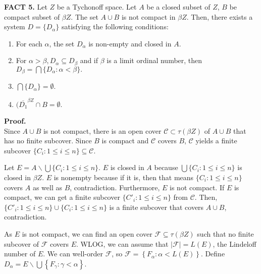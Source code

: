 \documentclass{article}
\begin{document}
\textbf{FACT 5.} Let $Z$ be a Tychonoff space. Let $A$ be a closed subset of $Z$, $B$ be compact subset of $\beta Z$. 
The set $A\cup B$ is not compact in $\beta Z$. 
Then, there exists a system $D=\{D_\alpha\}$ satisfying the following conditions:
\begin{enumerate}
\item For each $  \alpha  $, the set $ D_\alpha  $ is non-empty and closed in $A$.
\item For $ \alpha>\beta, D_\alpha \subseteq D_\beta  $ and if $  \beta $ is a limit ordinal number, then\\$  D_\beta=\bigcap \{D_\alpha:\alpha <\beta\}.$
\item $ \bigcap\{D_\alpha\}=\emptyset . $
\item $(\overline{D_1}^{\beta Z}\cap B =\emptyset.$
	 
\end{enumerate}

\textbf{Proof.} \\
Since $A\cup B $ is not compact, there is an open cover $\mathcal{C} \subset \tau(\beta Z)$ of $A\cup B$ that has no finite subcover.  Since $B$ is compact and $\mathcal{C}$ covers $B$, $\mathcal{C}$ yields a finite subcover $\{C_i:1\leq i \leq n\}\subseteq \mathcal{C}$.
\vskip 10pt

Let $E=A\backslash \bigcup \{C_i:1\leq i \leq n\}$. $E$ is closed in $A$ because $\bigcup \{C_i:1\leq i \leq n\}$ is closed in $\beta Z$. $E$ is nonempty because if it is, then that means $\{C_i:1\leq i \leq n\}$ covers $A$ as well as $B$, contradiction. Furthermore, $E$ is not compact. If $E$ is compact, we can get a finite subcover $\{C'_i:1\leq i\leq n\}$ from $\mathcal{C}$. Then, $\{C'_i:1\leq i\leq n\} \cup \{C_i:1\leq i \leq n\}$ is a finite subcover that covers $A\cup B$, contradiction. 


\vskip 10pt


As $E$ is not compact, we can find an open cover $\mathcal{F}\subseteq \tau(\beta Z)$ such that no finite subcover of $\mathcal{F}$ covers $E$. 
WLOG, we can assume that $|\mathcal{F}|=L(E)$, the Lindeloff number of $E$. We can well-order $\mathcal{F}$, so $\mathcal{F}=\left\{F_\alpha: \alpha<L(E)\right\}$.
Define $D_\alpha=E\backslash \bigcup \left\{F_\gamma: \gamma<\alpha\right\}$. 
\end{document}
